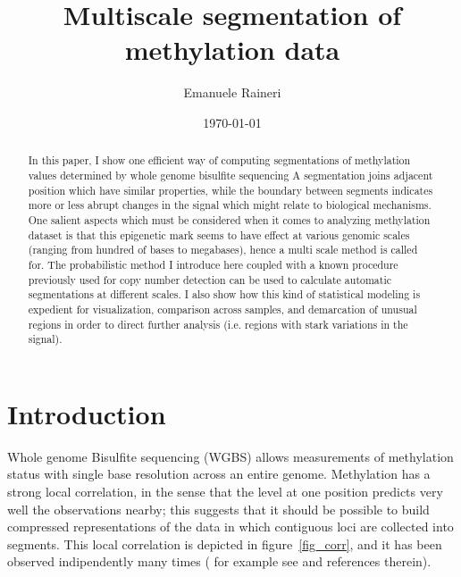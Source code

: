 \documentclass[12pt]{amsart}
\begin{document}
\title{Multiscale segmentation of methylation data}
\author{Emanuele Raineri}
\date{\today}
\maketitle

\begin{abstract}
In this paper, I show one efficient way of computing 
segmentations of methylation values determined by 
whole genome bisulfite sequencing
A segmentation joins adjacent position
which have similar properties, while the boundary between segments 
indicates more or less abrupt changes
in the signal which might relate to biological mechanisms. 
One salient aspects which must be considered when it comes to 
analyzing methylation dataset is that this epigenetic mark seems 
to have effect at various genomic scales 
(ranging from hundred of bases to megabases), hence a multi scale method 
is called for. 
The probabilistic method I introduce here 
coupled with a known procedure previously
used for copy number detection
can be used to calculate automatic segmentations at different scales.
I also show how this 
kind of statistical modeling is expedient for 
visualization, comparison across samples,
and demarcation of unusual regions in 
order to direct further analysis (i.e. regions with stark variations in the signal).
\end{abstract}

\section{Introduction}

Whole genome Bisulfite sequencing (WGBS) allows measurements of methylation 
status with single base resolution across an entire genome. 
Methylation has a strong local correlation,
in the sense that the level at one position predicts 
very well the observations nearby; this suggests that it should be possible
to build compressed representations of the data in which contiguous loci 
are collected into segments.
This local correlation is depicted in figure~\ref{fig_corr},
and it has been observed indipendently many times ( for example
see \cite{bsmooth} and references therein).
\end{document}
